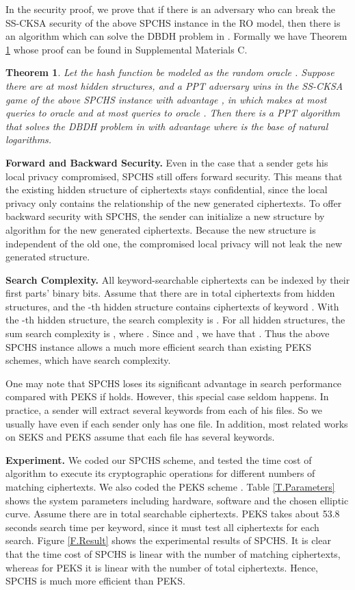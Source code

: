 \documentclass[10pt,twocolumn,twoside]{IEEEtran}
\newtheorem{theorem}{Theorem}
\begin{document}
{In the security proof, we prove that if there is an adversary who can break the SS-CKSA security of the above SPCHS instance in the RO model, then there is an algorithm which can solve the DBDH problem in . Formally we have Theorem \ref{T.SPCHS.Instance.Security} whose proof can be found in Supplemental Materials C.

\begin{theorem}\label{T.SPCHS.Instance.Security}
Let the hash function  be modeled as the random oracle . Suppose there are at most  hidden structures, and a PPT adversary  wins in the SS-CKSA game of the above SPCHS instance with advantage , in which
 makes at most  queries to oracle  and at most  queries to oracle . Then there is a PPT algorithm  that solves the
DBDH problem in  with advantage
 where  is the base of natural logarithms.
\end{theorem}

\textbf{Forward and Backward Security.} Even in the case that a sender 
gets his local privacy  compromised, SPCHS still offers forward security. This means that the existing hidden structure of ciphertexts stays confidential, since the local privacy only contains the relationship of the new generated ciphertexts. To offer backward security with SPCHS, the sender can initialize a new structure by algorithm  for the new generated ciphertexts. Because the new structure is independent of the old one, the compromised local privacy will not leak the new generated structure.

\textbf{Search Complexity.} All keyword-searchable ciphertexts can be indexed by their first parts' binary bits. Assume that there are in total  ciphertexts from  hidden structures, and the -th hidden structure contains  ciphertexts of keyword . With the -th hidden structure, the search complexity is . For all hidden structures, the sum search complexity is , where . Since  and , we have that . Thus the above SPCHS instance allows a much more efficient search than existing PEKS schemes, which have  search complexity.

One may note that SPCHS loses its significant advantage in search performance compared with PEKS if  holds. However, this special case seldom happens. In practice, a sender will extract several keywords from 
each of his files. So we usually have   even if each sender only has one file. In addition, most related works on SEKS and PEKS assume that each file has several keywords.  

\textbf{Experiment.} We coded our SPCHS scheme, and tested the time cost of algorithm  to execute its cryptographic operations for different numbers of matching ciphertexts. We also coded the PEKS scheme \cite{BCO04}. Table \ref{T.Parameters} shows the system parameters including hardware, software and the chosen elliptic curve. Assume there are in total  searchable ciphertexts. PEKS takes about 53.8 seconds search time per keyword, since it must test all ciphertexts for each search. 
Figure \ref{F.Result} shows the experimental results of SPCHS. It is clear that the time cost of SPCHS is linear with the number of matching ciphertexts, whereas for PEKS it is linear with 
the number of total ciphertexts. Hence, SPCHS is much more efficient than PEKS. 

}
\end{document}
